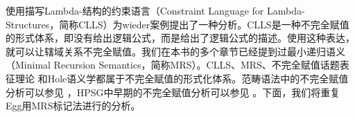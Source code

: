  \citet{Egg99a}使用描写Lambda-结构的约束语言（Constraint Language for Lambda-Structures，简称CLLS）为wieder案例提出了一种分析。CLLS是一种不完全赋值的形式体系，即没有给出逻辑公式，而是给出了逻辑公式的描述。使用这种表达，就可以让辖域关系不完全赋值。我们在本书的多个章节已经提到过最小递归语义（Minimal Recursion Semantics，简称MRS）\indexmrsc\citep*{CFPS2005a}。CLLS、MRS、不完全赋值话题表征理论  \citep{Reyle93b-u,FR95a-u}和Hole语义学\citep{Bos96a-u,BB2005a}都属于不完全赋值的形式化体系。范畴语法\indexcgc 中的不完全赋值分析可以参见  ，HPSG\indexhpsgc 中早期的不完全赋值分析可以参见 。下面，我们将重复Egg用MRS标记法进行的分析。

